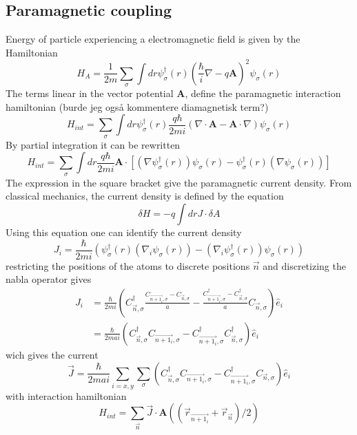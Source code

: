 \documentclass{article}
\begin{document}
\subsection{Paramagnetic coupling}
Energy of particle experiencing a electromagnetic field is given by the Hamiltonian
\begin{equation}
    H_A = \frac{1}{2m} \sum_{\sigma} \int dr \psi_{\sigma}^{\dagger}(r) \left( \frac{\hbar}{i} \nabla - q \textbf{A} \right)^2 \psi_{\sigma}(r) 
\end{equation}
The terms linear in the vector potential $\textbf{A}$, define the paramagnetic interaction hamiltonian (burde jeg også kommentere diamagnetisk term?)
\begin{equation}
    H_{int} = \sum_{\sigma} \int dr  \psi_{\sigma}^{\dagger}(r) \frac{q\hbar}{2mi}\left(  \nabla \cdot \textbf{A}  -  \textbf{A} \cdot \nabla \right) \psi_{\sigma}(r) 
\end{equation}
By partial integration it can be rewritten
\begin{equation}
    H_{int} = \sum_{\sigma} \int dr \frac{q\hbar}{2mi} \textbf{A} \cdot \left[  (\nabla  \psi_{\sigma}^{\dagger}(r)) \psi_{\sigma}(r)   -   \psi_{\sigma}^{\dagger}(r) (\nabla \psi_{\sigma}(r))  \right]
\end{equation}
The expression in the square bracket give the paramagnetic current density. From classical mechanics, the current density is defined by the equation
\begin{equation}
    \delta H = - q \int dr J \cdot \delta A
\end{equation}
Using this equation one can identify the current density
\begin{equation}
    J_i = \frac{\hbar}{2mi} (\psi_{\sigma}^{\dagger}(r) (\nabla_i \psi_{\sigma}(r)) - (\nabla_i  \psi_{\sigma}^{\dagger}(r)) \psi_{\sigma}(r))
\end{equation}
restricting the positions of the atoms to discrete positions $\vec{n}$ and discretizing the nabla operator gives
\begin{align}
    J_i &= \frac{\hbar}{2mi} (C_{\vec{n},\sigma}^{\dagger} \frac{C_{\vec{n + 1_i},\sigma} - C_{\vec{n},\sigma}}{a}  - \frac{C_{\vec{n + 1_i},\sigma}^{\dagger} - C_{\vec{n},\sigma}^{\dagger}}{a} C_{\vec{n},\sigma}) \hat{e}_i\\
      &= \frac{\hbar}{2mai} (C_{\vec{n},\sigma}^{\dagger} C_{\vec{n + 1_i},\sigma} - C_{\vec{n + 1_i},\sigma}^{\dagger} C_{\vec{n},\sigma}^{\dagger})\hat{e}_i
\end{align}
wich gives the current 
\begin{equation}
    \vec{J} = \frac{\hbar}{2mai} \sum_{i=x,y}\sum_{\sigma} (C_{\vec{n},\sigma}^{\dagger} C_{\vec{n + 1_i},\sigma} - C_{\vec{n + 1_i},\sigma}^{\dagger} C_{\vec{n},\sigma})\hat{e}_i
    \label{electric current}
\end{equation}
with interaction hamiltonian 
\begin{equation}
    H_{int} = \sum_{\vec{n}} \vec{J} \cdot \textbf{A}((\vec{r}_{\vec{n + 1_i}} + \vec{r}_{\vec{n}})/2 )
    \label{interaction hamiltonian general}
\end{equation}
\end{document}
